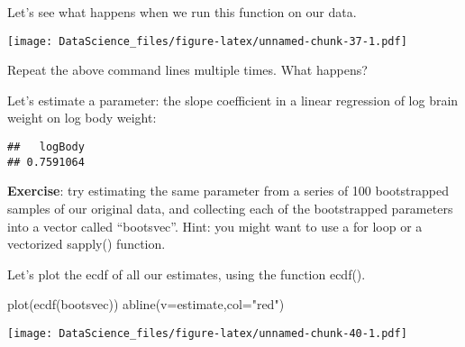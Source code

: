 \documentclass[
]{book}
\newenvironment{Shaded}{\begin{snugshade}}{\end{snugshade}}
\newcommand{\AttributeTok}[1]{\textcolor[rgb]{0.77,0.63,0.00}{#1}}
\newcommand{\DecValTok}[1]{\textcolor[rgb]{0.00,0.00,0.81}{#1}}
\newcommand{\FunctionTok}[1]{\textcolor[rgb]{0.00,0.00,0.00}{#1}}
\newcommand{\NormalTok}[1]{#1}
\newcommand{\OtherTok}[1]{\textcolor[rgb]{0.56,0.35,0.01}{#1}}
\newcommand{\SpecialCharTok}[1]{\textcolor[rgb]{0.00,0.00,0.00}{#1}}
\newcommand{\StringTok}[1]{\textcolor[rgb]{0.31,0.60,0.02}{#1}}
\begin{document}
Let's see what happens when we run this function on our data.

\begin{Shaded}
\end{Shaded}

\texttt{[image: DataScience\_files/figure-latex/unnamed-chunk-37-1.pdf]}

Repeat the above command lines multiple times. What happens?

Let's estimate a parameter: the slope coefficient in a linear regression of log brain weight on log body weight:

\begin{Shaded}
\end{Shaded}

\begin{verbatim}
##   logBody 
## 0.7591064
\end{verbatim}

\textbf{Exercise}: try estimating the same parameter from a series of 100 bootstrapped samples of our original data, and collecting each of the bootstrapped parameters into a vector called ``bootsvec''. Hint: you might want to use a for loop or a vectorized sapply() function.

Let's plot the ecdf of all our estimates, using the function ecdf().

\begin{Shaded}
\begin{Highlighting}[]
\FunctionTok{plot}\NormalTok{(}\FunctionTok{ecdf}\NormalTok{(bootsvec))}
\FunctionTok{abline}\NormalTok{(}\AttributeTok{v=}\NormalTok{estimate,}\AttributeTok{col=}\StringTok{"red"}\NormalTok{)}
\end{Highlighting}
\end{Shaded}

\texttt{[image: DataScience\_files/figure-latex/unnamed-chunk-40-1.pdf]}
\end{document}
